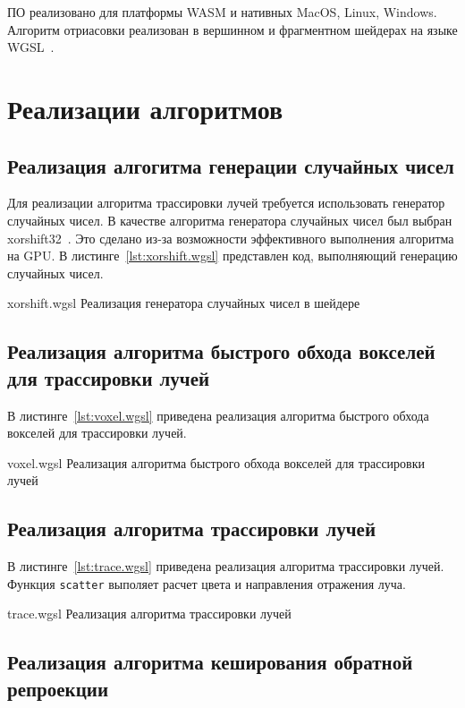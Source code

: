ПО реализовано для платформы WASM и нативных MacOS, Linux, Windows. 
Алгоритм отриасовки реализован в вершинном и фрагментном шейдерах на языке WGSL~\cite{WebGPUSL}.

\section{Реализации алгоритмов}

\subsection{Реализация алгогитма генерации случайных чисел}

Для реализации алгоритма трассировки лучей требуется использовать генератор случайных чисел.
В качестве алгоритма генератора случайных чисел был выбран xorshift32~\cite{xorshift}. Это сделано
из-за возможности эффективного выполнения алгоритма на GPU. В листинге~\ref{lst:xorshift.wgsl} представлен
код, выполняющий генерацию случайных чисел.

    {xorshift.wgsl}
    {Реализация генератора случайных чисел в шейдере}

\subsection{Реализация алгоритма быстрого обхода вокселей для трассировки лучей}

В листинге~\ref{lst:voxel.wgsl} приведена реализация алгоритма быстрого 
обхода вокселей для трассировки лучей.

\pagebreak

    {voxel.wgsl}
    {Реализация алгоритма быстрого обхода вокселей для трассировки лучей}

\subsection{Реализация алгоритма трассировки лучей}

В листинге~\ref{lst:trace.wgsl} приведена реализация алгоритма трассировки лучей.
Функция \verb|scatter| выполяет расчет цвета и направления отражения луча.

    {trace.wgsl}
    {Реализация алгоритма трассировки лучей}

\subsection{Реализация алгоритма кеширования обратной репроекции}

